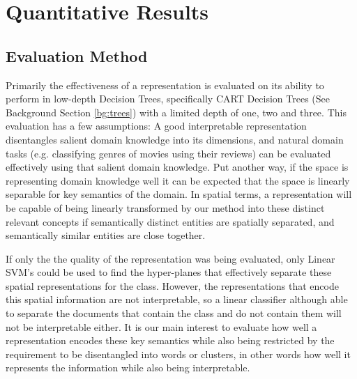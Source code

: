 

\section{Quantitative Results}


\subsection{Evaluation Method}

Primarily the effectiveness of a representation is evaluated on its ability to perform in low-depth Decision Trees, specifically CART Decision Trees (See Background Section \ref{bg:trees}) with a limited depth of one, two and three. This evaluation has a few assumptions: A good interpretable representation disentangles salient domain knowledge into its dimensions, and natural domain tasks (e.g. classifying genres of movies using their reviews) can be evaluated effectively using that salient domain knowledge. Put another way, if the space is representing domain knowledge well it can be expected that the space is linearly separable for key semantics of the domain. In spatial terms, a representation will be capable of being linearly transformed by our method into these distinct relevant concepts if semantically distinct entities are spatially separated, and semantically similar entities are close together.

If only the the quality of the representation was being evaluated, only Linear SVM's could be used to find the hyper-planes that effectively separate these spatial representations for the class. However, the representations that encode this spatial information are not interpretable, so a linear classifier although able to separate the documents that contain the class and do not contain them will not be interpretable either. It is our main interest to evaluate how well a representation encodes these key semantics while also being restricted by the requirement to be disentangled into words or clusters, in other words how well it represents the information while also being interpretable.

